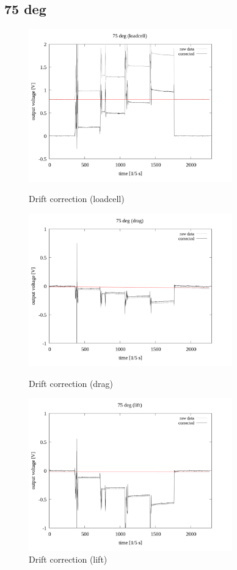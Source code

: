 \documentclass[twocolumn,a4j]{jsarticle}
\begin{document}
\newpage
\subsection{75 deg}
\begin{figure}[htbp]
    \footnotesize
    \begin{center}
        \includegraphics[width=88mm]{../images/drift/75_loadcell_drift.png}
        \caption{Drift correction (loadcell)}
        \includegraphics[width=88mm]{../images/drift/75_drag_drift.png}
        \caption{Drift correction (drag)}
        \includegraphics[width=88mm]{../images/drift/75_lift_drift.png}
        \caption{Drift correction (lift)}
    \end{center}
\end{figure}
\end{document}
